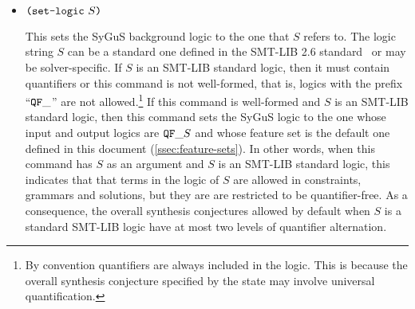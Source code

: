 \documentclass[english,a4paper,10pt]{article}
\begin{document}
\begin{itemize}
\item $\texttt{(}\texttt{set-logic}\mbox{ }S\texttt{)}$

This sets the SyGuS background logic
to the one that $S$ refers to.
The logic string $S$ can be a standard one defined in the SMT-LIB 2.6 standard~\cite{BarFT-RR-17}
or may be solver-specific.
If $S$ is an SMT-LIB standard logic,
then it must 
contain quantifiers or this command is not well-formed,
that is, logics with the prefix ``${\tt QF\_}$'' are not allowed.\footnote{
By convention quantifiers are always included in the logic. This is because
the overall synthesis conjecture specified by the
state may involve universal quantification.
}
If this command is well-formed and $S$ is an SMT-LIB standard logic,
then this command sets the SyGuS logic to the one whose
input and output logics are ${\tt QF\_}S$ and whose feature
set is the default one defined in this document (\cref{ssec:feature-sets}).
In other words, when this command has $S$ as an argument
and $S$ is an SMT-LIB standard logic, this
indicates that that terms in the logic of $S$ are 
allowed in constraints, grammars and solutions, but they are
are restricted to be quantifier-free.
As a consequence, 
the overall synthesis conjectures 
allowed by default when $S$ is a standard SMT-LIB logic
have at most two levels of quantifier alternation.

\begin{comment}
\item $\paren{\setlogicinputkwd\mbox{ }S}$

This sets the input logic component of the SyGuS background logic
to the one $S$ refers to,
which can be a standard one defined in SMT-LIB~\cite{BarFT-RR-17}
or may be solver-specific.
This command adds the set of sort and function symbols
from the logic to the current signature.
Some of the standard logics defined by SMT-LIB that can be an argument of this
command are given in \cref{ssec:smt-logic}.


\end{comment}
\end{itemize}
\end{document}
